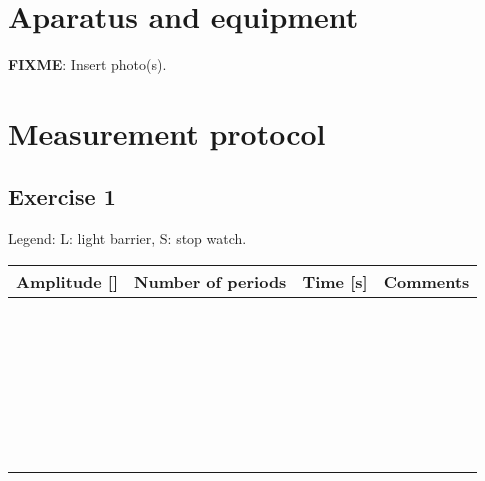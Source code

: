 \documentclass[a4paper,german,12pt,smallheadings]{scrartcl}
\begin{document}
\section*{Aparatus and equipment}
\textbf{FIXME}: Insert photo(s).

\newpage
\section*{Measurement protocol}
\subsection*{Exercise 1}
Legend: L: light barrier, S: stop watch.

\begin{tabular}{l|l|l|l}
  Amplitude [\quad\quad] & Number of periods & Time [s] \qquad\qquad\qquad & Comments \qquad\qquad\qquad\qquad\qquad\qquad \\
  \hline
   &  &  &  \\
  \hline
   &  &  &  \\
  \hline
   &  &  &  \\
  \hline
   &  &  &  \\
  \hline
   &  &  &  \\
  \hline
   &  &  &  \\
  \hline
   &  &  &  \\
  \hline
   &  &  &  \\
  \hline
   &  &  &  \\
  \hline
   &  &  &  \\
  \hline
   &  &  &  \\
  \hline
   &  &  &  \\
  \hline
   &  &  &  \\
  \hline
   &  &  &  \\
  \hline
   &  &  &  \\
  \hline
   &  &  &  \\
  \hline
   &  &  &  \\
  \hline
   &  &  &  \\
  \hline
   &  &  &  \\
  \hline
   &  &  &  \\
  \hline
   &  &  &  \\
  \hline
   &  &  &  \\
  \hline
   &  &  &  \\
  \hline
   &  &  &  \\
  \hline
   &  &  &  \\
  \hline
   &  &  &  \\
  \hline
   &  &  &  \\
  \hline
   &  &  &  \\
  \hline
   &  &  &  \\
\end{tabular}
\end{document}

